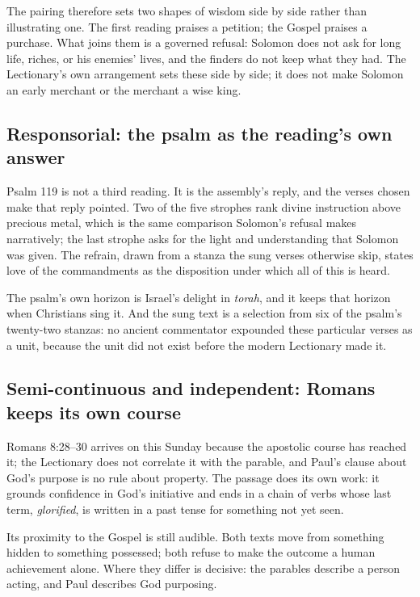 The pairing therefore sets two shapes of wisdom side by side rather than illustrating one. The first reading praises a petition; the Gospel praises a purchase. What joins them is a governed refusal: Solomon does not ask for long life, riches, or his enemies' lives, and the finders do not keep what they had. The Lectionary's own arrangement sets these side by side; it does not make Solomon an early merchant or the merchant a wise king.

\subsection*{Responsorial: the psalm as the reading's own answer}

Psalm 119 is not a third reading. It is the assembly's reply, and the verses chosen make that reply pointed. Two of the five strophes rank divine instruction above precious metal, which is the same comparison Solomon's refusal makes narratively; the last strophe asks for the light and understanding that Solomon was given. The refrain, drawn from a stanza the sung verses otherwise skip, states love of the commandments as the disposition under which all of this is heard.

The psalm's own horizon is Israel's delight in \emph{torah}, and it keeps that horizon when Christians sing it. And the sung text is a selection from six of the psalm's twenty-two stanzas: no ancient commentator expounded these particular verses as a unit, because the unit did not exist before the modern Lectionary made it.

\subsection*{Semi-continuous and independent: Romans keeps its own course}

Romans 8:28--30 arrives on this Sunday because the apostolic course has reached it; the Lectionary does not correlate it with the parable, and Paul's clause about God's purpose is no rule about property. The passage does its own work: it grounds confidence in God's initiative and ends in a chain of verbs whose last term, \emph{glorified}, is written in a past tense for something not yet seen.

Its proximity to the Gospel is still audible. Both texts move from something hidden to something possessed; both refuse to make the outcome a human achievement alone. Where they differ is decisive: the parables describe a person acting, and Paul describes God purposing.

